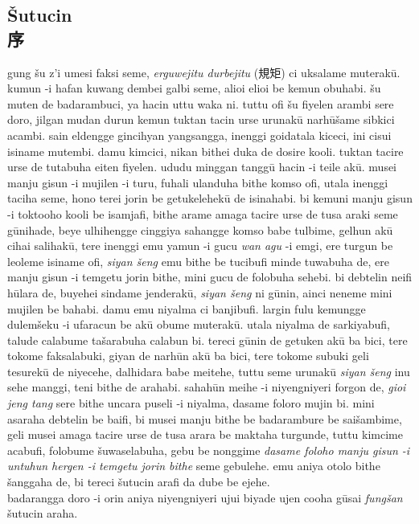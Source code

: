 \documentclass{article}
\begin{document}
\subsection{\v{S}utucin\\序}
gung \v{s}u z'i umesi faksi seme, \emph{erguwejitu durbejitu} (規矩) ci uksalame muterak\={u}. kumun -i hafan kuwang dembei galbi seme, alioi elioi be kemun obuhabi. \v{s}u muten de badarambuci, ya hacin uttu waka ni. tuttu ofi \v{s}u fiyelen arambi sere doro, jilgan mudan durun kemun tuktan tacin urse urunak\={u} narh\={u}\v{s}ame sibkici acambi. sain eldengge gincihyan yangsangga, inenggi goidatala kiceci, ini cisui isiname mutembi. damu kimcici, nikan bithei duka de dosire kooli. tuktan tacire urse de tutabuha eiten fiyelen. ududu minggan tangg\={u} hacin -i teile ak\={u}. musei manju gisun -i mujilen -i turu, fuhali ulanduha bithe komso ofi, utala inenggi taciha seme, hono terei jorin be getukelehek\={u} de isinahabi. bi kemuni manju gisun -i toktooho kooli be isamjafi, bithe arame amaga tacire urse de tusa araki seme g\={u}nihade, beye ulhihengge cinggiya sahangge komso babe tulbime, gelhun ak\={u} cihai salihak\={u}, tere inenggi emu yamun -i gucu \emph{wan agu} -i emgi, ere turgun be leoleme isiname ofi, \emph{siyan \v{s}eng} emu bithe be tucibufi minde tuwabuha de, ere manju gisun -i temgetu jorin bithe, mini gucu de folobuha sehebi. bi debtelin neifi h\={u}lara de, buyehei sindame jenderak\={u}, \emph{siyan \v{s}eng} ni g\={u}nin, ainci neneme mini mujilen be bahabi. damu emu niyalma ci banjibufi. largin fulu kemungge dulem\v{s}eku -i ufaracun be ak\={u} obume muterak\={u}. utala niyalma de sarkiyabufi, talude calabume ta\v{s}arabuha calabun bi. tereci g\={u}nin de getuken ak\={u} ba bici, tere tokome faksalabuki, giyan de narh\={u}n ak\={u} ba bici, tere tokome subuki geli tesurek\={u} de niyecehe, dalhidara babe meitehe, tuttu seme urunak\={u} \emph{siyan \v{s}eng} inu sehe manggi, teni bithe de arahabi. sahah\={u}n meihe -i niyengniyeri forgon de, \emph{gioi jeng tang} sere bithe uncara puseli -i niyalma, dasame foloro mujin bi. mini asaraha debtelin be baifi, bi musei manju bithe be badarambure be sai\v{s}ambime, geli musei amaga tacire urse de tusa arara be maktaha turgunde, tuttu kimcime acabufi, folobume \v{s}uwaselabuha, gebu be nonggime \emph{dasame foloho manju gisun -i untuhun hergen -i temgetu jorin bithe} seme gebulehe. emu aniya otolo bithe \v{s}anggaha de, bi tereci \v{s}utucin arafi da dube be ejehe.\\

\noindent badarangga doro -i orin aniya niyengniyeri ujui biyade ujen cooha g\={u}sai \emph{fung\v{s}an} \v{s}utucin araha.\\
\end{document}

